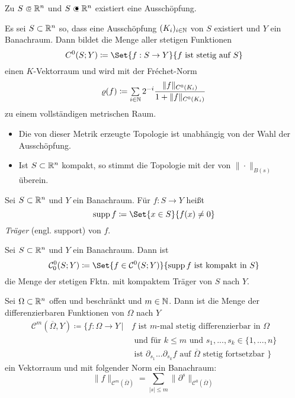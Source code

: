 \documentclass{cheat-sheet}
\begin{document}
\begin{bem}
  Zu $S \opn \R^n$ und $S \cls \R^n$ existiert eine Ausschöpfung.
\end{bem}

\begin{defn}
  Es sei $S \subset \mathbb{R}^n$ so, dass eine Ausschöpfung $(K_i)_{i \in \mathbb{N}}$ von $S$ existiert und $Y$ ein Banachraum. Dann bildet die Menge aller stetigen Funktionen
  \[ C^0(S; Y) \coloneqq \Set{ f : S \to Y }{ f \text{ ist stetig auf } S } \]
  einen $K$-Vektorraum und wird mit der Fréchet-Norm
  \[ \varrho(f) \coloneqq \sum_{i \in \N} 2^{-i} \frac{ \| f \|_{C^0(K_i)} }{ 1 + \| f \|_{C^0(K_i)} } \]
  zu einem vollständigen metrischen Raum.
\end{defn}

\begin{bem}
  \begin{itemize}
    \item Die von dieser Metrik erzeugte Topologie ist unabhängig von der Wahl der Ausschöpfung.
    \item Ist $S \subset \mathbb{R}^n$ kompakt, so stimmt die Topologie mit der von $\| \cdot \|_{B(s)}$ überein.
  \end{itemize}
\end{bem}

\begin{defn}
  Sei $S \subset \mathbb{R}^n$ und $Y$ ein Banachraum. Für $f : S \to Y$ heißt
  \[ \supp f \coloneqq \Set{ x \in S }{ f(x) \not= 0 } \]
  \emph{Träger} (engl. support) von $f$.
\end{defn}

\begin{defn}
  Sei $S \subset \mathbb{R}^n$ und $Y$ ein Banachraum. Dann ist
  \[ \mathcal{C}_0^0(S; Y) \coloneqq \Set{ f \in \mathcal{C}^0(S; Y) }{ \supp f \text{ ist kompakt in } S } \]
  die Menge der stetigen Fktn. mit kompaktem Träger von $S$ nach $Y$.
\end{defn}

\begin{defn}
  Sei $\Omega \subset \mathbb{R}^n$ offen und beschränkt und $m \in \mathbb{N}$. Dann ist die Menge der differenzierbaren Funktionen von $\Omega$ nach $Y$
  \begin{align*}
    \mathcal{C}^m(\overline\Omega, Y) \coloneqq \{ f : \Omega \to Y \,|\, & f \text{ ist $m$-mal stetig differenzierbar in $\Omega$ } \\
    & \text{ und für $k \leq m$ und } s_1, ..., s_k \in \{ 1, ..., n \} \\
    & \text{ ist $\partial_{s_1} ... \partial_{s_k} f$ auf $\overline\Omega$ stetig fortsetzbar } \}
  \end{align*}
  ein Vektorraum und mit folgender Norm ein Banachraum:
  \[ \| f \|_{\mathcal{C}^m(\overline\Omega)} = \sum_{|s| \leq m} \| \partial^s \|_{\mathcal{C}^0(\overline\Omega)} \]
\end{defn}
\end{document}
